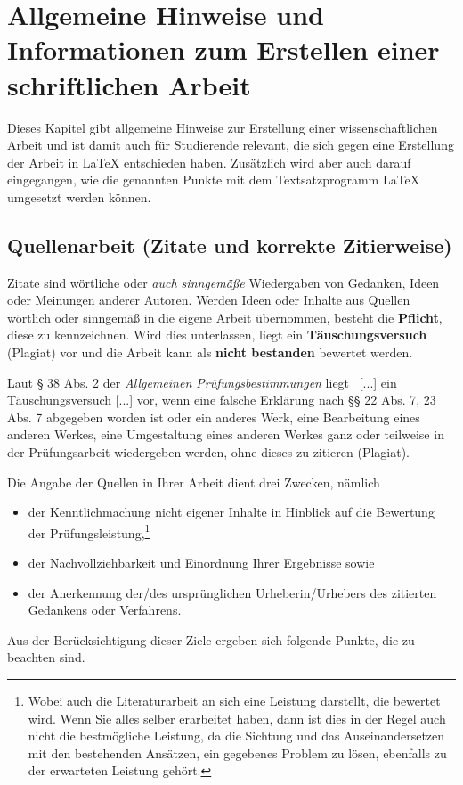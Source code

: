 \chapter{Allgemeine Hinweise und Informationen zum Erstellen einer schriftlichen Arbeit}
\label{cha:Hinweise_Allgemein}

Dieses Kapitel gibt allgemeine Hinweise zur Erstellung einer wissenschaftlichen Arbeit und ist damit auch für Studierende relevant, die sich gegen eine Erstellung der Arbeit in \LaTeX{} entschieden haben.
Zusätzlich wird aber auch darauf eingegangen, wie die genannten Punkte mit dem Textsatzprogramm \LaTeX{} umgesetzt werden können.



\section{Quellenarbeit (Zitate und korrekte Zitierweise)}
\label{sec:Latex-Zitieren}



Zitate sind wörtliche oder \emph{auch sinngemäße} Wiedergaben von Gedanken, Ideen oder Meinungen anderer Autoren.
Werden Ideen oder Inhalte aus Quellen wörtlich oder sinngemäß in die eigene Arbeit übernommen, besteht die \textbf{Pflicht}, diese zu kennzeichnen.
Wird dies unterlassen, liegt ein \textbf{Täuschungsversuch} (Plagiat) vor und die Arbeit kann als \textbf{nicht bestanden} bewertet werden.

Laut § 38 Abs. 2 der \emph{Allgemeinen Prüfungsbestimmungen} liegt \glqq\ [...] ein Täuschungsversuch [...] vor, wenn eine falsche Erklärung nach §§ 22 Abs. 7, 23 Abs. 7 abgegeben worden ist oder ein anderes Werk, eine Bearbeitung eines anderen Werkes, eine Umgestaltung eines anderen Werkes ganz oder teilweise in der Prüfungsarbeit wiedergeben werden, ohne dieses zu zitieren (Plagiat).\grqq~\cite{APB}


Die Angabe der Quellen in Ihrer Arbeit dient drei Zwecken, nämlich
\begin{itemize}
  \item der Kenntlichmachung nicht eigener Inhalte in Hinblick auf die Bewertung der Prüfungsleistung,\footnote{Wobei auch die Literaturarbeit an sich eine Leistung darstellt, die bewertet wird. Wenn Sie alles selber erarbeitet haben, dann ist dies in der Regel auch nicht die bestmögliche Leistung, da die Sichtung und das Auseinandersetzen mit den bestehenden Ansätzen, ein gegebenes Problem zu lösen, ebenfalls zu der erwarteten Leistung gehört.}
  \item der Nachvollziehbarkeit und Einordnung Ihrer Ergebnisse sowie
  \item der Anerkennung der/des ursprünglichen Urheberin/Urhebers des zitierten Gedankens oder Verfahrens.
\end{itemize}
Aus der Berücksichtigung dieser Ziele ergeben sich folgende Punkte, die zu beachten sind.

